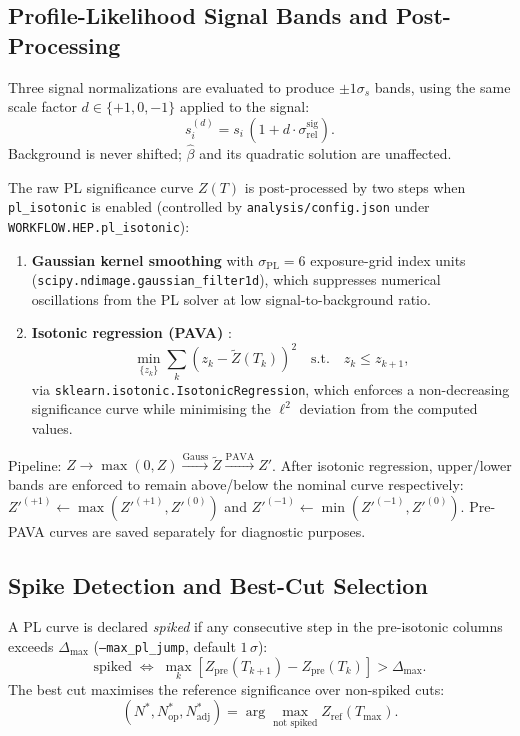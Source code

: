 \documentclass[12pt,a4paper]{article}
\newcommand{\si}{s_{i}}                  %
\newcommand{\bhat}{\hat{\beta}}
\newcommand{\srel}{\sigma_{\mathrm{rel}}}
\begin{document}
\subsection{Profile-Likelihood Signal Bands and Post-Processing}
\label{sec:pl_bands}

Three signal normalizations are evaluated to produce $\pm1\sigma_s$ bands,
using the same scale factor $d \in \{+1, 0, -1\}$ applied to the signal:
\begin{equation}
  s_i^{(d)} = \si\,(1 + d\cdot\srel^{\mathrm{sig}}).
  \label{eq:signal_variation}
\end{equation}
Background is never shifted; $\bhat$ and its quadratic solution are
unaffected.

The raw PL significance curve $Z(T)$ is post-processed by two steps when
\texttt{pl\_isotonic} is enabled (controlled by \texttt{analysis/config.json}
under \texttt{WORKFLOW.HEP.pl\_isotonic}):
\begin{enumerate}[leftmargin=*]
  \item \textbf{Gaussian kernel smoothing} with $\sigma_{\mathrm{PL}}=6$
    exposure-grid index units
    (\texttt{scipy.ndimage.gaussian\_filter1d}), which suppresses numerical
    oscillations from the PL solver at low signal-to-background ratio.
  \item \textbf{Isotonic regression (PAVA)} \cite{Robertson1988}:
    \begin{equation}
      \min_{\{z_k\}}\sum_k(z_k-\tilde{Z}(T_k))^2
      \quad\text{s.t.}\quad z_k\le z_{k+1},
      \label{eq:pava}
    \end{equation}
    via \texttt{sklearn.isotonic.IsotonicRegression},
    which enforces a non-decreasing significance curve while minimising the
    $\ell^2$ deviation from the computed values.
\end{enumerate}
Pipeline: $Z \to \max(0,Z) \xrightarrow{\mathrm{Gauss}} \tilde{Z}
          \xrightarrow{\mathrm{PAVA}} Z'$.
After isotonic regression, upper/lower bands are enforced to remain
above/below the nominal curve respectively:
$Z'^{(+1)}\leftarrow\max(Z'^{(+1)}, Z'^{(0)})$ and
$Z'^{(-1)}\leftarrow\min(Z'^{(-1)}, Z'^{(0)})$.
Pre-PAVA curves are saved separately for diagnostic purposes.

\subsection{Spike Detection and Best-Cut Selection}
\label{sec:spike}

A PL curve is declared \emph{spiked} if any consecutive step in the
pre-isotonic columns exceeds $\Delta_{\max}$
(\texttt{--max\_pl\_jump}, default $1\,\sigma$):
\begin{equation}
  \text{spiked} \;\Leftrightarrow\;
  \max_k\!\left[Z_{\mathrm{pre}}(T_{k+1})-Z_{\mathrm{pre}}(T_k)\right]>\Delta_{\max}.
  \label{eq:spike_criterion}
\end{equation}
The best cut maximises the reference significance over non-spiked cuts:
\begin{equation}
  (N^*,N_{\mathrm{op}}^*,N_{\mathrm{adj}}^*) =
  \arg\max_{\text{not spiked}} Z_{\mathrm{ref}}(T_{\max}).
  \label{eq:best_cut}
\end{equation}
\end{document}
